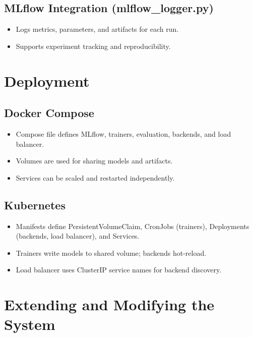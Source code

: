 \documentclass[11pt]{article}
\begin{document}
\subsection{MLflow Integration (mlflow_logger.py)}
\begin{itemize}
  \item Logs metrics, parameters, and artifacts for each run.
  \item Supports experiment tracking and reproducibility.
\end{itemize}

\section{Deployment}
\subsection{Docker Compose}
\begin{itemize}
  \item Compose file defines MLflow, trainers, evaluation, backends, and load balancer.
  \item Volumes are used for sharing models and artifacts.
  \item Services can be scaled and restarted independently.
\end{itemize}

\subsection{Kubernetes}
\begin{itemize}
  \item Manifests define PersistentVolumeClaim, CronJobs (trainers), Deployments (backends, load balancer), and Services.
  \item Trainers write models to shared volume; backends hot-reload.
  \item Load balancer uses ClusterIP service names for backend discovery.
\end{itemize}

\section{Extending and Modifying the System}
\end{document}
